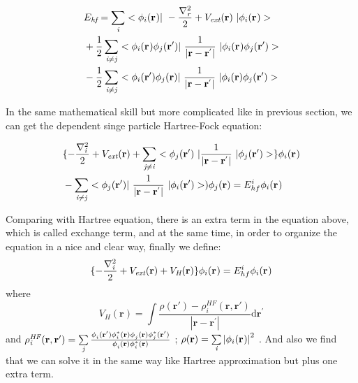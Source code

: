 \documentclass[a4paper, 12pt, titlepage,oneside,drop]{kthesis}
\begin{document}
\begin{equation}\begin{split}
&E_\textit{hf} = \sumi<i> <\bwf<i><> |\ -\frac{\nabla^{2}_{\textit r}}{2} + V_\textit{ext}(\textbf{r})  \ | \bwf<i><> > \\
& + \frac{1}{2} \suminj<i><j> <\bwf<i><> \bwfn<j><'>|\ \frac{1}{|\textbf{r} - \textbf{r}^{'} |} \ | \bwf<i><> \bwfn<j><'>> \\
& - \frac{1}{2} \suminj<i><j> <\bwfn<i><'> \bwfn<j><>|\ \frac{1}{|\textbf{r} - \textbf{r}^{'} |} \ | \bwfn<i><> \bwfn<j><'>>
\end{split}\end{equation}

\noindent In the same mathematical skill but more complicated like in previous section, we can get the dependent singe particle Hartree-Fock equation:

\begin{equation}\begin{split}
& \{ -\frac{\nabla^{2}_{\textit i}}{2} + V_\textit{ext}(\textbf{r})+ \suminj<j><i> <\bwfn<j><'>\ | \frac{1}{|\textbf{r} - \textbf{r}^{'} |} \ | \bwfn<j><'>> \} \bwf<i><>  \\
& - \suminj<i><j>  < \bwfn<j><'>|\ \frac{1}{|\textbf{r} - \textbf{r}^{'} |} \ | \bwfn<i><'> >) \bwfn<j><>  = E^{i}_{hf} \bwf<i><>
\end{split}\end{equation}

\noindent Comparing with Hartree equation, there is an extra term in the equation above, which is called exchange term, and at the same time,
 in order to organize the equation in a nice and clear way, finally we define:
\begin{equation}\begin{split}
\{ -\frac{\nabla^{2}_{\textit i}}{2} + V_\textit{ext}(\textbf{r}) +V_\textit{H}(\textbf{r}) \}  \bwf<i><>  = E^{i}_{hf}   \bwf<i><> 
\end{split}\end{equation}
where
\begin{equation}
 V_\textit{H}(\textbf{r})= \int \frac{\rho(\textbf{r}{'}) - \rho_{\textit{i}}^{\textit{HF}}(\textbf{r},\textbf{r}{'})}{|\textbf{r} - \textbf{r}^{'} |}  \mathrm{d}\textbf{r}^{'}
\end{equation}
and $ \rho_{\textit{i}}^{\textit{HF}}(\textbf{r},\textbf{r}{'}) = \sumi<j> \frac{\phi_{i}^{}(\textbf{r}{'}) \phi_{i}^{*}(\textbf{r}{}) \phi_{j}^{}(\textbf{r}{}) \phi_{j}^{*}(\textbf{r}{'})} {\phi_{i}^{}(\textbf{r}) \phi_{i}^{*}(\textbf{r})} $ 
; $\rho(\textbf{r}) = \sumi<i>  {|\bwf<i><>|}^{2}$ . And also we find that we can solve it in the same way like Hartree approximation but plus one
extra term.
\end{document}

